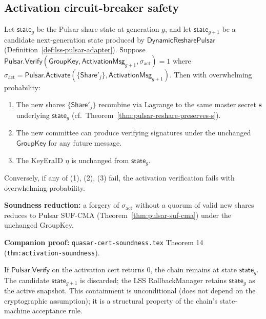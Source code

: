 
\subsection*{Activation circuit-breaker safety}

\begin{theorem}
\label{thm:pulsar-activation-safety}
Let $\mathsf{state}_g$ be the Pulsar share state at generation $g$, and
let $\mathsf{state}_{g+1}$ be a candidate next-generation state produced
by $\mathsf{DynamicResharePulsar}$
(Definition~\ref{def:lss-pulsar-adapter}). Suppose
$\mathsf{Pulsar.Verify}(\mathsf{GroupKey}, \mathsf{ActivationMsg}_{g+1},
\sigma_{\text{act}}) = 1$ where $\sigma_{\text{act}} = \mathsf{Pulsar.}
\mathsf{Activate}(\{\mathsf{Share}'_j\}, \mathsf{ActivationMsg}_{g+1})$.
Then with overwhelming probability:
\begin{enumerate}[nosep]
  \item The new shares $\{\mathsf{Share}'_j\}$ recombine via Lagrange
        to the same master secret $\mathbf{s}$ underlying
        $\mathsf{state}_g$ (cf.\ Theorem~\ref{thm:pulsar-reshare-preserves-s}).
  \item The new committee can produce verifying signatures under the
        unchanged $\mathsf{GroupKey}$ for any future message.
  \item The KeyEraID $\eta$ is unchanged from $\mathsf{state}_g$.
\end{enumerate}
Conversely, if any of (1), (2), (3) fail, the activation verification
fails with overwhelming probability.

\textbf{Soundness reduction:} a forgery of $\sigma_{\text{act}}$
without a quorum of valid new shares reduces to Pulsar SUF-CMA
(Theorem~\ref{thm:pulsar-suf-cma}) under the unchanged GroupKey.

\textbf{Companion proof:} \texttt{quasar-cert-soundness.tex}
Theorem 14 (\texttt{thm:activation-soundness}).
\end{theorem}

\begin{lemma}
\label{lem:activation-fail-safe}
If $\mathsf{Pulsar.Verify}$ on the activation cert returns $0$, the
chain remains at state $\mathsf{state}_g$. The candidate
$\mathsf{state}_{g+1}$ is discarded; the LSS RollbackManager retains
$\mathsf{state}_g$ as the active snapshot. This containment is
unconditional (does not depend on the cryptographic assumption); it is
a structural property of the chain's state-machine acceptance rule.
\end{lemma}
